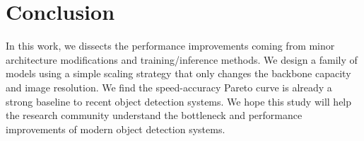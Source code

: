 \documentclass[final]{cvpr}
\begin{document}

\section{Conclusion}\label{sec:conclusion}
In this work, we dissects the performance improvements coming from minor architecture modifications and training/inference methods. We design a family of models using a simple scaling strategy that only changes the backbone capacity and image resolution. We find the speed-accuracy Pareto curve is already a strong baseline to recent object detection systems. We hope this study will help the research community understand the bottleneck and performance improvements of modern object detection systems.
\end{document}
